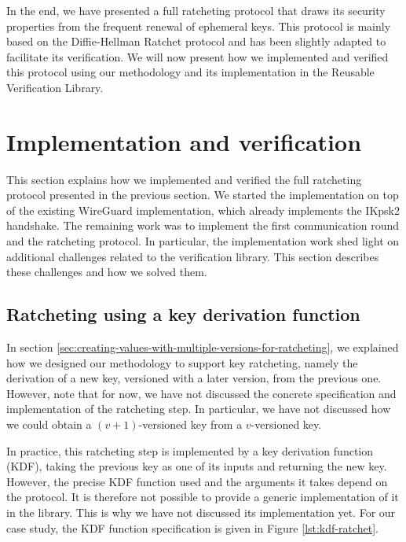 In the end, we have presented a full ratcheting protocol that draws its security properties from the frequent renewal of ephemeral keys. This protocol is mainly based on the Diffie-Hellman Ratchet protocol and has been slightly adapted to facilitate its verification. 
We will now present how we implemented and verified this protocol using our methodology and its implementation in the Reusable Verification Library. 

\section{Implementation and verification}
\label{sec:implementation-and-verification}

This section explains how we implemented and verified the full ratcheting protocol presented in the previous section.
We started the implementation on top of the existing WireGuard implementation, which already implements the IKpsk2 handshake.
The remaining work was to implement the first communication round and the ratcheting protocol.
In particular, the implementation work shed light on additional challenges related to the verification library. This section describes these challenges and how we solved them.


\subsection{Ratcheting using a key derivation function}
\label{sec:ratcheting-using-a-key-derivation-function}

In section \ref{sec:creating-values-with-multiple-versions-for-ratcheting}, we explained how we designed our methodology to support key ratcheting, namely the derivation of a new key, versioned with a later version, from the previous one.
However, note that for now, we have not discussed the concrete specification and implementation of the ratcheting step. In particular, we have not discussed how we could obtain a $(v+1)$-versioned key from a $v$-versioned key.

In practice, this ratcheting step is implemented by a key derivation function (KDF), taking the previous key as one of its inputs and returning the new key.
However, the precise KDF function used and the arguments it takes depend on the protocol. It is therefore not possible to provide a generic implementation of it in the library. This is why we have not discussed its implementation yet.
For our case study, the KDF function specification is given in Figure \ref{lst:kdf-ratchet}.

